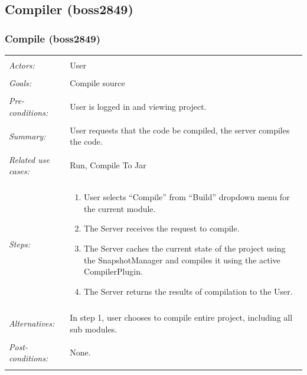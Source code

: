 \documentclass[11pt]{article}
\begin{document}
\subsection{Compiler (boss2849)}
\subsubsection{Compile (boss2849)}
\begin{tabular}{ p{2cm} p{12cm} }
 \hline
 \\
 \textit{Actors:} & User \\ 
 \\
 \textit{Goals:} & Compile source \\
 \\
 \textit{Pre-conditions:} & User is logged in and viewing project. \\
 \\
 \textit{Summary:} & User requests that the code be compiled, the server compiles the code. \\
 \\
 \textit{Related use cases:} & Run, Compile To Jar \\ 
 \\
 \textit{Steps:} & \begin{enumerate}
   \item User selects ``Compile'' from ``Build'' dropdown menu for the current module.
   \item The Server receives the request to compile.
   \item The Server caches the current state of the project using the SnapshotManager and compiles it using the active CompilerPlugin.
   \item The Server returns the results of compilation to the User.
 \end{enumerate} \\
 \\
 \textit{Alternatives:} & In step 1, user chooses to compile entire project, including all sub modules. \\
 \\
 \textit{Post-conditions:} & None. \\
 \\
\hline
\end{tabular}
\end{document}
